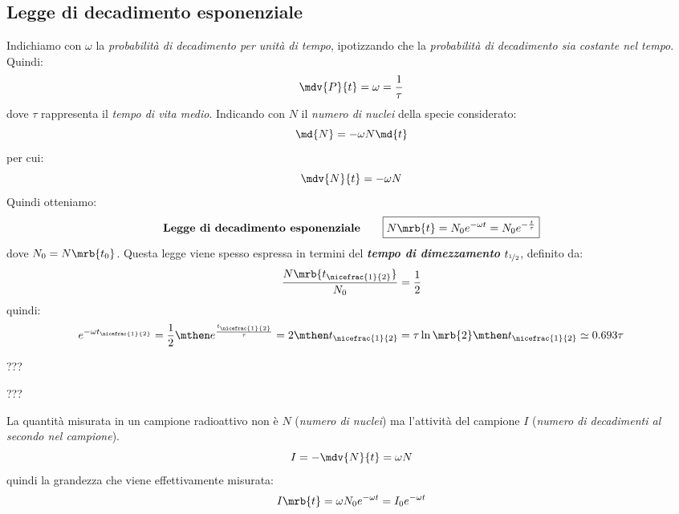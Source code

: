 \subsection{Legge di decadimento esponenziale}
Indichiamo con $\omega$ la \textit{probabilità di decadimento per unità di
tempo}, ipotizzando che la \textit{probabilità di decadimento sia costante nel
tempo}. Quindi:
\begin{equation}
  \mdv{P}{t} = \omega = \frac{1}{\tau}
\end{equation}
dove $\tau$ rappresenta il \textit{tempo di vita medio}.
Indicando con $N$ il \textit{numero di nuclei} della specie considerato:
\begin{equation}
  \md{N} = -\omega N \md{t}
\end{equation}
per cui:
\begin{equation}
  \mdv{N}{t} = - \omega N
\end{equation}
Quindi otteniamo:
\begin{equation}
  \textbf{Legge di decadimento esponenziale}\qquad
  \boxed{
    N \mrb{t} = N_0 e^{- \omega t} = N_0 e^{-\frac{t}{\tau}}
  }
\end{equation}
dove $N_0 = N \mrb{t_0}$.
Questa legge viene spesso espressa in termini del \textit{\textbf{tempo di
dimezzamento}} $t_{\nicefrac{1}{2}}$, definito da:
\begin{equation}
  \frac{N \mrb{t_{\nicefrac{1}{2}}}}{N_0} = \frac{1}{2}
\end{equation}
quindi:
\begin{equation}
  e^{- \omega t _{\nicefrac{1}{2}}} = \frac{1}{2}
  \mthen
  e^{\frac{t _{\nicefrac{1}{2}}}{\tau}} = 2
  \mthen
  t _{\nicefrac{1}{2}} = \tau \ln \mrb{2}
  \mthen
  t _{\nicefrac{1}{2}} \simeq 0.693\tau 
\end{equation}

\begin{note}[Curie]
  ???
\end{note}

\begin{note}[Becquerel]
  ???
\end{note}

\begin{note}[]
  La quantità misurata in un campione radioattivo non è $N$ (\textit{numero di
  nuclei}) ma l'attività del campione $I$ (\textit{numero di decadimenti al
  secondo nel campione}).
  \begin{equation}
    I = - \mdv{N}{t} = \omega N
  \end{equation}
  quindi la grandezza che viene effettivamente misurata:
  \begin{equation}
    I \mrb{t}
    = \omega N_0 e^{- \omega t}
    = I _{0} e^{- \omega t}
  \end{equation}

\end{note}

